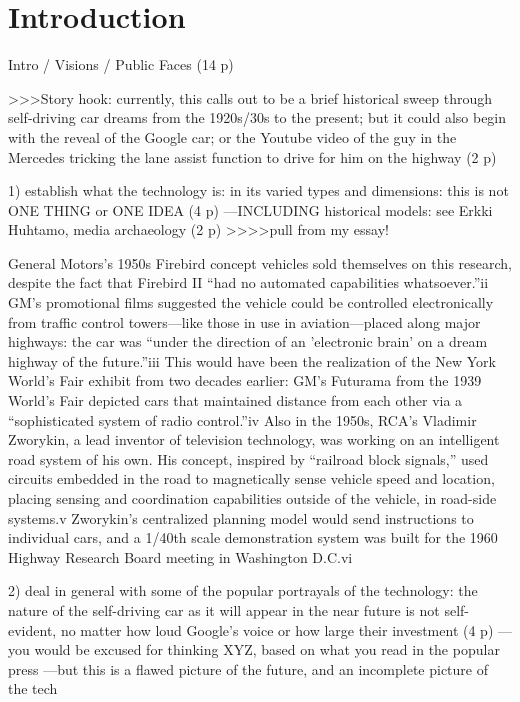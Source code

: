 \chapter{Introduction}

Intro / Visions / Public Faces (14 p)

>>>Story hook: currently, this calls out to be a brief historical
sweep through self-driving car dreams from the 1920s/30s to the
present; but it could also begin with the reveal of the Google car; or
the Youtube video of the guy in the Mercedes tricking the lane assist
function to drive for him on the highway (2 p)

1) establish what the technology is: in its varied types and
dimensions: this is not ONE THING or ONE IDEA (4 p)
---INCLUDING historical models: see Erkki Huhtamo, media archaeology
(2 p)
>>>>pull from my essay!

General Motors's 1950s Firebird concept
vehicles sold themselves on this research, despite the fact that
Firebird II “had no automated capabilities whatsoever.”ii GM's
promotional films suggested the vehicle could be controlled
electronically from traffic control towers—like those in use in
aviation—placed along major highways: the car was “under the direction
of an 'electronic brain' on a dream highway of the future.”iii This
would have been the realization of the New York World's Fair exhibit
from two decades earlier: GM's Futurama from the 1939 World's Fair
depicted cars that maintained distance from each other via a
“sophisticated system of radio control.”iv Also in the 1950s, RCA's
Vladimir Zworykin, a lead inventor of television technology, was
working on an intelligent road system of his own. His concept,
inspired by “railroad block signals,” used circuits embedded in the
road to magnetically sense vehicle speed and location, placing sensing
and coordination capabilities outside of the vehicle, in road-side
systems.v Zworykin's centralized planning model would send
instructions to individual cars, and a 1/40th scale demonstration
system was built for the 1960 Highway Research Board meeting in
Washington D.C.vi


2) deal in general with some of the popular portrayals of the
technology: the nature of the self-driving car as it will appear in
the near future is not self-evident, no matter how loud Google's voice
or how large their investment (4 p)
---you would be excused for thinking XYZ, based on what you read in
the popular press
---but this is a flawed picture of the future, and an incomplete
picture of the tech

